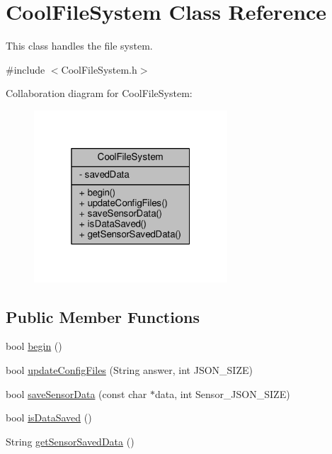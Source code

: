 \hypertarget{classCoolFileSystem}{}\section{Cool\+File\+System Class Reference}
\label{classCoolFileSystem}


This class handles the file system.  




{\ttfamily \#include $<$Cool\+File\+System.\+h$>$}



Collaboration diagram for Cool\+File\+System\+:\nopagebreak
\begin{figure}[H]
\begin{center}
\leavevmode
\includegraphics[width=205pt]{classCoolFileSystem__coll__graph}
\end{center}
\end{figure}
\subsection*{Public Member Functions}
\begin{DoxyCompactItemize}
\item 
bool \hyperlink{classCoolFileSystem_a6ba6f666ed4c530174f8569d2c636748}{begin} ()
\item 
bool \hyperlink{classCoolFileSystem_a32dad79ae80182a83e2e8f52286b7c7b}{update\+Config\+Files} (String answer, int J\+S\+O\+N\+\_\+\+S\+I\+ZE)
\item 
bool \hyperlink{classCoolFileSystem_a4c560c2ddd40b74b7758e6ceb2c58957}{save\+Sensor\+Data} (const char $\ast$data, int Sensor\+\_\+\+J\+S\+O\+N\+\_\+\+S\+I\+ZE)
\item 
bool \hyperlink{classCoolFileSystem_a5a7eaeea7a9fbf8aaef651d862fa3b5b}{is\+Data\+Saved} ()
\item 
String \hyperlink{classCoolFileSystem_a5c58bca3735c0ed3efb268d70ef998ef}{get\+Sensor\+Saved\+Data} ()
\end{DoxyCompactItemize}
